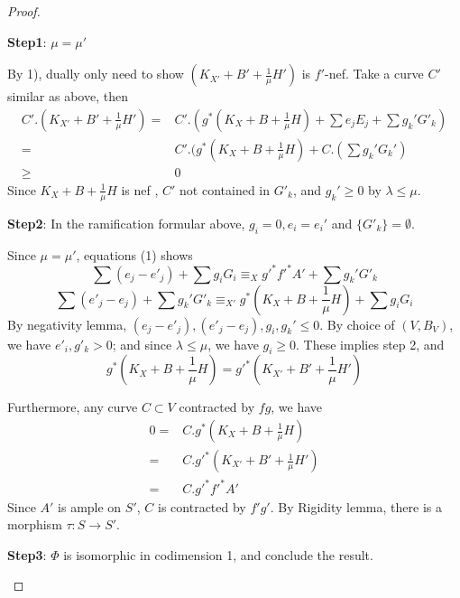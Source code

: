 \documentclass{article}
\begin{document}
\begin{proof}
\begin{enumerate}
\textbf{Step1}: $ \mu=\mu' $

By 1), dually only need to show $ (K_{X'}+B'+\frac{1}{\mu}H') $ is $ f' $-nef. Take a curve $ C' $ similar as above, then
\begin{equation*}
\begin{aligned}
C'.(K_{X'}+B'+\frac{1}{\mu}H')=&C'.(g^*(K_{X}+B+\frac{1}{\mu}H)+\sum e_jE_j+ \sum g_k'G'_k)\\
=&C'.(g^*(K_{X}+B+\frac{1}{\mu}H)+C.(\sum g_k'G_k')\\
\geqslant&0
\end{aligned}
\end{equation*}
Since $ K_{X}+B+\frac{1}{\mu}H $ is nef , $ C' $ not contained in $ G'_k $, and $ g_k'\geqslant 0 $ by $ \lambda\leqslant \mu. $

\textbf{Step2}: In the ramification formular above, $ g_i=0, e_i=e_i' $ and $ \{G'_k\}=\emptyset $.

Since $ \mu=\mu' $, equations (1) shows
$$ \sum(e_j-e'_j)+\sum g_iG_i\equiv_X g'^*f'^*A'+\sum g_k'G'_k $$
$$ \sum(e'_j-e_j)+\sum g_k'G'_k\equiv_{X'} g^*(K_{X}+B+\frac{1}{\mu}H)+\sum g_iG_i $$
By negativity lemma, $ (e_j-e'_j), (e'_j-e_j), g_i,g_k'\leqslant 0$. By choice of $ (V,B_V) $, we have $ e'_i,g'_k>0 $; and since $\lambda\leqslant\mu$, we have $ g_i\geqslant 0 $. These implies step 2, and
$$ g^*(K_{X}+B+\frac{1}{\mu}H)=g'^*(K_{X'}+B'+\frac{1}{\mu}H') $$

Furthermore, any curve $ C\subset V $ contracted by $ fg $, we have
\begin{equation*}
\begin{aligned}
0=&C.g^*(K_{X}+B+\frac{1}{\mu}H)\\
=&C.g'^*(K_{X'}+B'+\frac{1}{\mu}H') \\
=&C.g'^*f'^*A'
\end{aligned}
\end{equation*}
Since $ A' $ is ample on $ S' $, $ C $ is contracted by $ f'g' $. By Rigidity lemma, there is a morphism $ \tau:S\to S' $.

\textbf{Step3}: $ \Phi $ is isomorphic in codimension 1, and conclude the result.


\end{enumerate}
\end{proof}
\end{document}
